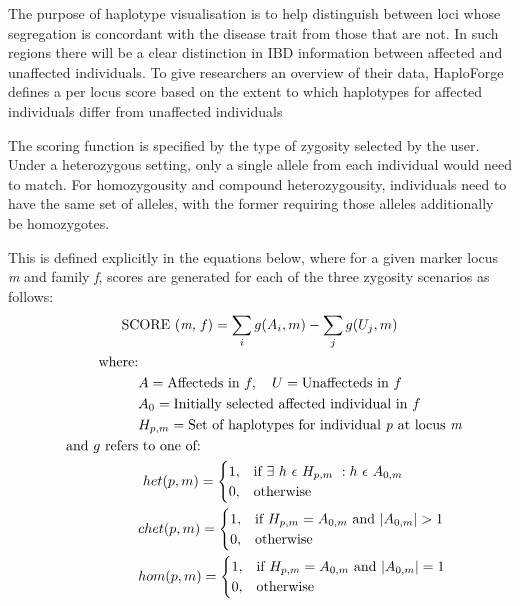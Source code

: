 \documentclass{bioinfo}
\numberwithin{equation}{section}
\def\haplo{{HaploForge}}
\begin{document}
\begin{methods}
The purpose of haplotype visualisation is to help distinguish between loci whose segregation is concordant with the disease trait from those that are not. In such regions there will be a clear distinction in IBD information between affected and unaffected individuals. To give researchers an overview of their data, \haplo{} defines a per locus score based on the extent to which haplotypes for affected individuals differ from unaffected individuals

The scoring function is specified by the type of zygosity selected by the user. Under a heterozygous setting, only a single allele from each individual would need to match. For homozygousity and compound heterozygousity, individuals need to have the same set of alleles, with the former requiring those alleles additionally be homozygotes.

\pagebreak
This is defined explicitly in the equations below, where for a given marker locus \textit{m} and family \textit{f}, scores are generated for each of the three zygosity scenarios as follows:\
\begin{gather}
\text{SCORE (\textit{m, f})} = \sum_{i}{g(A_i,m)} - \sum_{j}{g(U_j,m)}\\
\
\begin{flalign}
\nonumber\
\text{where:}&\\
\nonumber\
& A = \text{Affecteds in }f,\ \ \ U = \text{Unaffecteds in }f\\
\nonumber\
& A_0 = \text{Initially selected affected individual in }f\\
\nonumber\
& H_{p,m} = \text{Set of haplotypes for individual \textit{p} at locus \textit{m}}\\
\nonumber\
\text{and }g \text{ refers} & \text{ to one of:}\\
\nonumber
& \ het(p,m) = \begin{cases}
	1 ,& \text{if } \exists\ h\ \epsilon\ H_{p,m}\ : h\ \epsilon\  A_{0,m}\\
	0 ,& \text{otherwise}
		\end{cases}\\
\nonumber\
& chet(p,m) = \begin{cases}
	1 ,& \text{if } H_{p,m} = A_{0,m} \text{ and } |A_{0,m}| > 1\\
	0 ,& \text{otherwise}
		\end{cases}\\
\nonumber
& hom(p,m) = \begin{cases}
	1 ,& \text{if } H_{p,m} = A_{0,m}  \text{ and } |A_{0,m}| = 1\\
	0 ,& \text{otherwise}
		\end{cases}\\
\nonumber
\end{flalign}
\end{gather}


\end{methods}
\end{document}
